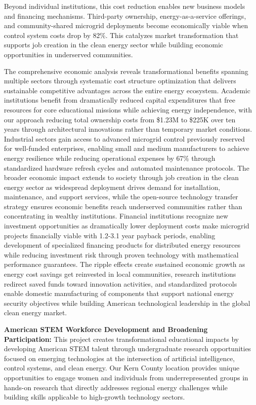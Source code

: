 \documentclass[12pt]{article}
\begin{document}
Beyond individual institutions, this cost reduction enables new business models and financing mechanisms. Third-party ownership, energy-as-a-service offerings, and community-shared microgrid deployments become economically viable when control system costs drop by 82\%. This catalyzes market transformation that supports job creation in the clean energy sector while building economic opportunities in underserved communities.

The comprehensive economic analysis reveals transformational benefits spanning multiple sectors through systematic cost structure optimization that delivers sustainable competitive advantages across the entire energy ecosystem. Academic institutions benefit from dramatically reduced capital expenditures that free resources for core educational missions while achieving energy independence, with our approach reducing total ownership costs from \$1.23M to \$225K over ten years through architectural innovations rather than temporary market conditions. Industrial sectors gain access to advanced microgrid control previously reserved for well-funded enterprises, enabling small and medium manufacturers to achieve energy resilience while reducing operational expenses by 67\% through standardized hardware refresh cycles and automated maintenance protocols. The broader economic impact extends to society through job creation in the clean energy sector as widespread deployment drives demand for installation, maintenance, and support services, while the open-source technology transfer strategy ensures economic benefits reach underserved communities rather than concentrating in wealthy institutions. Financial institutions recognize new investment opportunities as dramatically lower deployment costs make microgrid projects financially viable with 1.2-3.1 year payback periods, enabling development of specialized financing products for distributed energy resources while reducing investment risk through proven technology with mathematical performance guarantees. The ripple effects create sustained economic growth as energy cost savings get reinvested in local communities, research institutions redirect saved funds toward innovation activities, and standardized protocols enable domestic manufacturing of components that support national energy security objectives while building American technological leadership in the global clean energy market.

\textbf{American STEM Workforce Development and Broadening Participation:} This project creates transformational educational impacts by developing American STEM talent through undergraduate research opportunities focused on emerging technologies at the intersection of artificial intelligence, control systems, and clean energy. Our Kern County location provides unique opportunities to engage women and individuals from underrepresented groups in hands-on research that directly addresses regional energy challenges while building skills applicable to high-growth technology sectors.
\end{document}
